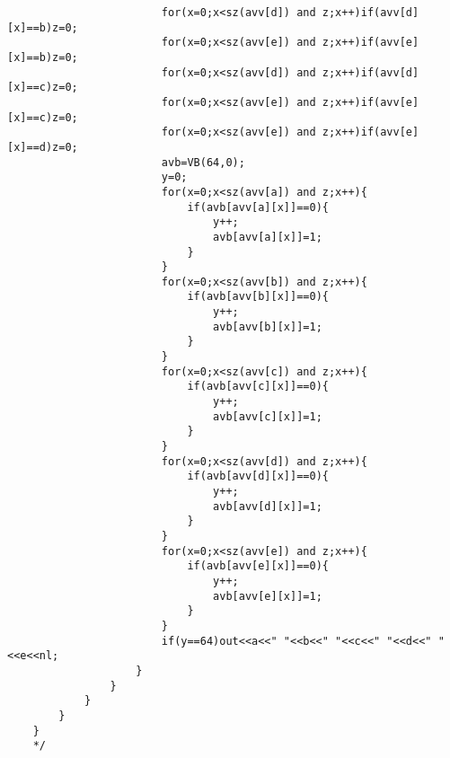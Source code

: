 \begin{verbatim}
						for(x=0;x<sz(avv[d]) and z;x++)if(avv[d][x]==b)z=0;
						for(x=0;x<sz(avv[e]) and z;x++)if(avv[e][x]==b)z=0;
						for(x=0;x<sz(avv[d]) and z;x++)if(avv[d][x]==c)z=0;
						for(x=0;x<sz(avv[e]) and z;x++)if(avv[e][x]==c)z=0;
						for(x=0;x<sz(avv[e]) and z;x++)if(avv[e][x]==d)z=0;
						avb=VB(64,0);
						y=0;
						for(x=0;x<sz(avv[a]) and z;x++){
							if(avb[avv[a][x]]==0){
								y++;
								avb[avv[a][x]]=1;
							}
						}
						for(x=0;x<sz(avv[b]) and z;x++){
							if(avb[avv[b][x]]==0){
								y++;
								avb[avv[b][x]]=1;
							}
						}
						for(x=0;x<sz(avv[c]) and z;x++){
							if(avb[avv[c][x]]==0){
								y++;
								avb[avv[c][x]]=1;
							}
						}
						for(x=0;x<sz(avv[d]) and z;x++){
							if(avb[avv[d][x]]==0){
								y++;
								avb[avv[d][x]]=1;
							}
						}
						for(x=0;x<sz(avv[e]) and z;x++){
							if(avb[avv[e][x]]==0){
								y++;
								avb[avv[e][x]]=1;
							}
						}
						if(y==64)out<<a<<" "<<b<<" "<<c<<" "<<d<<" "<<e<<nl;
					}
				}
			}
		}
	}
	*/


\end{verbatim}
